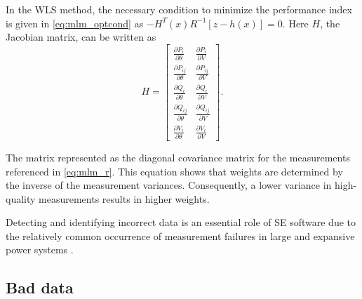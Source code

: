 
In the WLS method, the necessary condition to minimize the performance index is given in \ref{eq:mlm_optcond}  as \(-H^{T}(x) R^{-1}[z-h(x)]=0\). Here $H$, the  Jacobian matrix, can be written as
\begin{equation}
H = 
\left[
\begin{array}{cc}
\frac{\partial P_i}{\partial \theta} & \frac{\partial P_i}{\partial V} \\
\frac{\partial P_{ij}}{\partial \theta} & \frac{\partial P_{ij}}{\partial V} \\
\frac{\partial Q_i}{\partial \theta} & \frac{\partial Q_i}{\partial V} \\
\frac{\partial Q_{ij}}{\partial \theta} & \frac{\partial Q_{ij}}{\partial V} \\
\frac{\partial V_i}{\partial \theta} & \frac{\partial V_i}{\partial V}
\end{array}
\right].
\end{equation}

The matrix represented as the diagonal covariance matrix for the measurements referenced in \ref{eq:mlm_r}. This equation shows that weights are determined by the inverse of the measurement variances. Consequently, a lower variance in high-quality measurements results in higher weights.

Detecting and identifying incorrect data is an essential role of SE software due to the relatively common occurrence of measurement failures in large and expansive power systems \autocite{WU199080}.

\subsection{Bad data}\label{subsec:ch1/sec4/sub4}

